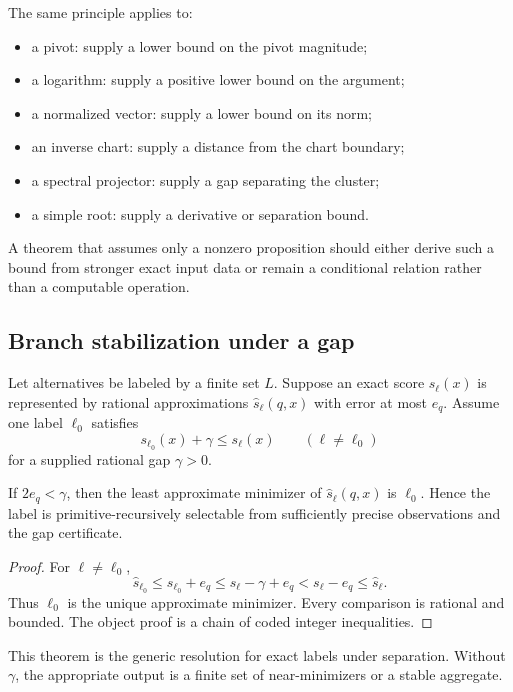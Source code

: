 The same principle applies to:

\begin{itemize}
\item a pivot: supply a lower bound on the pivot magnitude;
\item a logarithm: supply a positive lower bound on the argument;
\item a normalized vector: supply a lower bound on its norm;
\item an inverse chart: supply a distance from the chart boundary;
\item a spectral projector: supply a gap separating the cluster;
\item a simple root: supply a derivative or separation bound.
\end{itemize}

A theorem that assumes only a nonzero proposition should either derive such a bound from stronger exact input data or remain a conditional relation rather than a computable operation.

\subsection{Branch stabilization under a gap}

Let alternatives be labeled by a finite set \(L\).  Suppose an exact score \(s_\ell(x)\) is represented by rational approximations \(\widehat s_\ell(q,x)\) with error at most \(e_q\).  Assume one label \(\ell_0\) satisfies
\[
 s_{\ell_0}(x)+\gamma\le s_\ell(x)
 \qquad(\ell\ne\ell_0)
\]
for a supplied rational gap \(\gamma>0\).

\begin{theorem}
\label{thm:branch-stability}
If \(2e_q<\gamma\), then the least approximate minimizer of \(\widehat s_\ell(q,x)\) is \(\ell_0\).  Hence the label is primitive-recursively selectable from sufficiently precise observations and the gap certificate.
\end{theorem}

\begin{proof}
For \(\ell\ne\ell_0\),
\[
 \widehat s_{\ell_0}
 \le s_{\ell_0}+e_q
 \le s_\ell-\gamma+e_q
 < s_\ell-e_q
 \le \widehat s_\ell.
\]
Thus \(\ell_0\) is the unique approximate minimizer.  Every comparison is rational and bounded.  The object proof is a chain of coded integer inequalities.
\end{proof}

This theorem is the generic resolution for exact labels under separation.  Without \(\gamma\), the appropriate output is a finite set of near-minimizers or a stable aggregate.

